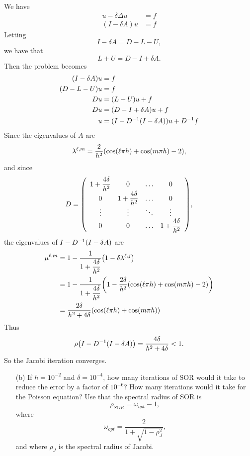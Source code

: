 \documentclass[12pt]{article}
\begin{document}
We have
\begin{align*}
            u - \delta\Delta u &= f \\
            (I - \delta A)u &= f
        \end{align*}
Letting $$I - \delta A = D - L - U,$$ we have that 
$$L + U = D - I + \delta A.$$
Then the problem becomes 
\begin{align*}
            (I - \delta A)u &= f \\
            (D - L - U)u &= f \\
            Du &= (L + U)u + f \\
            Du &= (D - I + \delta A)u + f \\
            u &= (I - D^{-1}\qty(I - \delta A))u + D^{-1}f
\end{align*}
Since the eigenvalues of $A$ are
$$\lambda^{\ell, m} = \dfrac{2}{h^2}\qty(\cos(\ell\pi h) + \cos(m\pi h) - 2),$$
and since 
        \begin{align*}
            D = \qty(\begin{array}{cccc}
                1 + \dfrac{4\delta}{h^2} & 0 & \dots & 0 \\
                0 & 1 + \dfrac{4\delta}{h^2} & \dots & 0 \\
                \vdots & \vdots & \ddots & \vdots \\
                0 & 0 & \dots & 1 + \dfrac{4\delta}{h^2}
            \end{array}),
        \end{align*}
the eigenvalues of $I - D^{-1}\qty(I - \delta A)$ are
 \begin{align*}
 \mu^{\ell,m} &= 1 - \frac{1}{1 + \dfrac{4\delta}{h^2}}\qty(1 - \delta \lambda^{\ell,j})\\
  &= 1 - \frac{1}{1 + \dfrac{4\delta}{h^2}} \qty(1 -\dfrac{2\delta}{h^2}(\cos(\ell\pi h) + \cos(m\pi h) - 2) ) \\
  &= \dfrac{2\delta}{h^2+4\delta}\qty(\cos(\ell \pi h) + \cos(m \pi h))
  \end{align*}
Thus $$\rho\qty(I - D^{-1}\qty(I - \delta A)) = \dfrac{4\delta}{h^2+4\delta} < 1.$$
So the Jacobi iteration converges.

    
\begin{itemize}
\item[(b)] If $h = 10^{-2}$ and $\delta = 10^{-4}$, how many iterations of SOR would it take to reduce the error by a factor of $10^{-6}$? How many iterations would it take for the Poisson equation? Use that the spectral radius of SOR is
$$\rho_{SOR} = \omega_{opt} -1,$$
where $$\omega_{opt} = \dfrac{2}{1+\sqrt{1-\rho_J^2}} ,$$
and where $\rho_J$ is the spectral radius of Jacobi.
\end{itemize}
\end{document}
